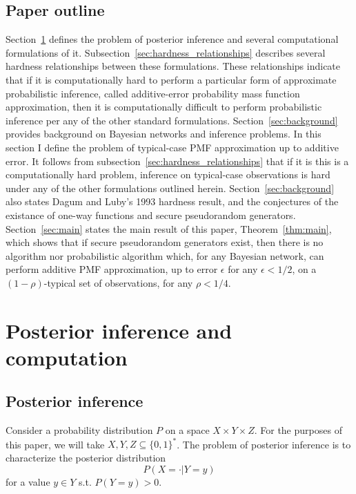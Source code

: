 \documentclass{article}
\theoremstyle{definition}
\theoremstyle{remark}
\begin{document}
\subsection{Paper outline}
Section~\ref{sec:posterior_inference} defines the problem of posterior inference and several computational formulations of it.
Subsection~\ref{sec:hardness_relationships} describes several hardness relationships between these formulations.
These relationships indicate that if it is computationally hard to perform a particular form of approximate probabilistic inference, called additive-error probability mass function approximation, then it is computationally difficult to perform probabilistic inference per any of the other standard formulations.
Section~\ref{sec:background} provides background on Bayesian networks and inference problems.
In this section I define the problem of typical-case PMF approximation up to additive error.
It follows from subsection~\ref{sec:hardness_relationships} that if it is this is a computationally hard problem, inference on typical-case observations is hard under any of the other formulations outlined herein.
Section~\ref{sec:background} also states Dagum and Luby's 1993 hardness result, and the conjectures of the existance of one-way functions and secure pseudorandom generators.
Section~\ref{sec:main} states the main result of this paper, Theorem~\ref{thm:main}, which shows that if secure pseudorandom generators exist, then there is no algorithm nor probabilistic algorithm which, for any Bayesian network, can perform additive PMF approximation, up to error $\epsilon$ for any $\epsilon < 1/2$, on a $(1 - \rho)$-typical set of observations, for any $\rho < 1/4$.

\section{Posterior inference and computation} \label{sec:posterior_inference}

\subsection{Posterior inference}

Consider a probability distribution $P$ on a space $X \times Y \times Z$.
For the purposes of this paper, we will take $X, Y, Z \subseteq \{0, 1\}^*$.
The problem of posterior inference is to characterize the posterior distribution
$$
P(X = \cdot | Y = y)
$$
for a value $y \in Y$ s.t. $P(Y = y) > 0$.
\end{document}
